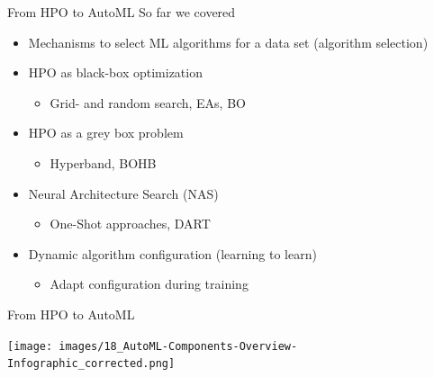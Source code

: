 

\usepackage[normalem]{ulem}
\usepackage{pifont}
\usepackage{relsize}
\renewcommand{\lit}[1]{{\smaller\color{black!60}[#1]}}
\subtitle{Wrap Up}




\maketitle



\begin{frame}{From HPO to AutoML}
  So far we covered
  \begin{itemize}
    \item Mechanisms to select ML algorithms for a data set (algorithm selection)
    \item HPO as black-box optimization
    \begin{itemize}
      \item Grid- and random search, EAs, BO
    \end{itemize}
    \item HPO as a grey box problem
    \begin{itemize}
      \item Hyperband, BOHB
    \end{itemize}
    \item Neural Architecture Search (NAS)
    \begin{itemize}
      \item One-Shot approaches, DART
    \end{itemize}
    \item Dynamic algorithm configuration (learning to learn)
    \begin{itemize}
      \item Adapt configuration during training
    \end{itemize}
  \end{itemize}  
\end{frame}

\begin{frame}{From HPO to AutoML}
    \begin{center}
      \texttt{[image: images/18\_AutoML-Components-Overview-Infographic\_corrected.png]}  
    \end{center}
\end{frame}

